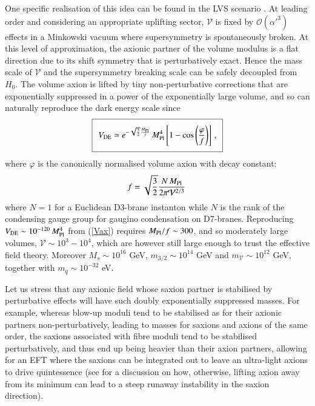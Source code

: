 One specific realisation of this idea can be found in the LVS scenario \cite{Cicoli:2021skd}. At leading order and considering an appropriate uplifting sector, $\mathcal{V}$ is fixed by $\mathcal{O}(\alpha'^3)$ effects in a Minkowski vacuum where supersymmetry is spontaneously broken. At this level of approximation, the axionic partner of the volume modulus is a flat direction due to its shift symmetry that is perturbatively exact. Hence the mass scale of $\mathcal{V}$ and the supersymmetry breaking scale can be safely decoupled from $H_0$. The volume axion is lifted by tiny non-perturbative corrections that are exponentially suppressed in a power of the exponentially large volume, and so can naturally reproduce the dark energy scale since 
\begin{equation}
\setlength\fboxsep{0.25cm}
\setlength\fboxrule{0.4pt}
\boxed{
V_{\rm DE} \simeq e^{-\sqrt{\frac32} \frac{M_{\rm Pl}}{f}}\,M_{\rm Pl}^4\left[1-\cos\left(\frac{\varphi}{f}\right)\right]\,,
}
\label{Vax}
\end{equation}
where $\varphi$ is the canonically normalised volume axion with decay constant:
\begin{equation}
f = \sqrt{\frac32}\frac{N\,M_{\rm Pl}}{2\pi\mathcal{V}^{2/3}} \,   
\end{equation}
where $N=1$ for a Euclidean D3-brane instanton while $N$ is the rank of the condensing gauge group for gaugino condensation on D7-branes. Reproducing $V_{\rm DE}\sim 10^{-120}\,M_{\rm Pl}^4$ from (\ref{Vax}) requires $M_{\rm Pl}/f\sim 300$, and so moderately large volumes, $\mathcal{V} \sim 10^3 - 10^4$, which are however still large enough to trust the effective field theory. Moreover $M_s\sim 10^{16}$ GeV, $m_{3/2}\sim 10^{14}$ GeV and $m_{\mathcal{V}}\sim 10^{12}$ GeV, together with $m_q \sim 10^{-32}$ eV. 

Let us stress that any axionic field whose saxion partner is stabilised by perturbative effects will have such doubly exponentially suppressed masses. For example, whereas blow-up moduli tend to be stabilised as for their axionic partners non-perturbatively, leading to masses for saxions and axions of the same order, the saxions associated with fibre moduli tend to be stabilised perturbatively, and thus end up being heavier than their axion partners, allowing for an EFT where the saxions can be integrated out to leave an ultra-light axions to drive quintessence (see \cite{Emelin:2018igk} for a discussion on how, otherwise, lifting axion away from its minimum can lead to a steep runaway instability in the saxion direction).  

